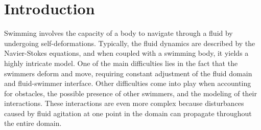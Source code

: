 \documentclass[graybox]{svmult}
\begin{document}
\section{Introduction}


Swimming involves the capacity of a body to navigate through a fluid by undergoing self-deformations. Typically, the fluid dynamics are described by the Navier-Stokes equations, and when coupled with a swimming body, it yields a highly intricate model. One of the main difficulties lies in the fact that the swimmers deform and move, requiring constant adjustment of the fluid domain and fluid-swimmer interface. Other difficulties come into play when accounting for obstacles, the possible presence of other swimmers, and the modeling of their interactions. These interactions are even more complex because disturbances caused by fluid agitation at one point in the domain can propagate throughout the entire domain.
\end{document}
